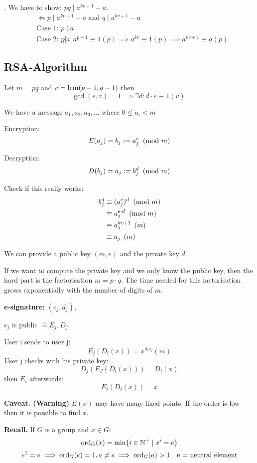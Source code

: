 \Proof.
We have to show: $pq \mid a ^{kv +1} - a$.
\begin{align*}
  &\Leftrightarrow p \mid a ^{kv +1} - a \text{ and } q \mid a ^{kv +1} - a\\
  &\text{Case 1: } p \mid a \\
  &\text{Case 2: } p\not| a:
    a^{p-1} \equiv 1 (p) \implies a^{kv} \equiv 1(p) \implies a^{kv+1} \equiv a(p)
\end{align*}

\subsection{RSA-Algorithm}
Let $m = pq$ and $v = \operatorname{lcm}(p-1, q-1)$ then
\[
  \gcd(e,v) = 1 \implies \exists d : d \cdot e \equiv 1 (v).
\]

We have a message $a_1, a_2, a_3, \ldots$ where $0 \leq a_i < m$

Encryption:
\[
  E(a_j) = b_j := a_j^e \imod{m}
\]

Decryption:
\[
  D(b_j) = a_j := b_j^d \imod{m}
\]

Check if this really works:
\begin{align*}
  b_j^d &\equiv (a_j^e)^d \imod{m} \\
    & \equiv a_j^{e \cdot d} \imod{m} \\
    & \equiv a_j^{kv+1} \pod{m} \\
    & \equiv a_j \pod{m} \\
\end{align*}

We can provide a public key $(m,e)$ and the private key $d$.

If we want to compute the private key and we only know the public key, then the hard part is the factorisation $m = p \cdot q$. The time needed for this factorisation grows exponentially with the number of digits of $m$.

\textbf{e-signature: }
$(e_j,d_j)$,

$e_j$ is public $\hat{=} E_j, D_j$

User i sends to user j:
\[
  E_j(D_i(x)) = x^{d_i e_j} (m)
\]
User j checks with his private key:
\[
  D_j (E_J(D_i(x))) = D_i(x)
\]
then $E_i$ afterwards:
\[
  E_i(D_i(x)) = x
\]

\textbf{Caveat. (Warning)}
$E(x)$ may have many fixed points.
If the order is low then it is possible to find $x$.

\textbf{Recall.}
If $G$ is a group and $x\in G$:
\[
  \operatorname{ord}_G(x) = \min\{ i\in \mathbb{N}^{+} \mid x^i = e \}
\]
\[
  e^1 = e \implies \operatorname{ord}_G(e) = 1, a \neq e \implies \operatorname{ord}_G(a) > 1 \quad \text{e = neutral element}
\]

